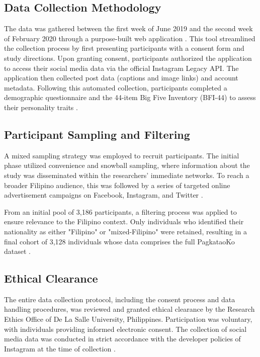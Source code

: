 \subsection{Data Collection Methodology}
The data was gathered between the first week of June 2019 and the second week of February 2020 through a purpose-built web application \citep{tighe_acorda_2022}. This tool streamlined the collection process by first presenting participants with a consent form and study directions. Upon granting consent, participants authorized the application to access their social media data via the official Instagram Legacy API. The application then collected post data (captions and image links) and account metadata. Following this automated collection, participants completed a demographic questionnaire and the 44-item Big Five Inventory (BFI-44) to assess their personality traits \citep{tighe_acorda_2022}.

\subsection{Participant Sampling and Filtering}
A mixed sampling strategy was employed to recruit participants. The initial phase utilized convenience and snowball sampling, where information about the study was disseminated within the researchers' immediate networks. To reach a broader Filipino audience, this was followed by a series of targeted online advertisement campaigns on Facebook, Instagram, and Twitter \citep{tighe_acorda_2022}.

From an initial pool of 3,186 participants, a filtering process was applied to ensure relevance to the Filipino context. Only individuals who identified their nationality as either "Filipino" or "mixed-Filipino" were retained, resulting in a final cohort of 3,128 individuals whose data comprises the full PagkataoKo dataset \citep{tighe_acorda_2022}.

\subsection{Ethical Clearance}
The entire data collection protocol, including the consent process and data handling procedures, was reviewed and granted ethical clearance by the Research Ethics Office of De La Salle University, Philippines. Participation was voluntary, with individuals providing informed electronic consent. The collection of social media data was conducted in strict accordance with the developer policies of Instagram at the time of collection \citep{tighe_acorda_2022}.

